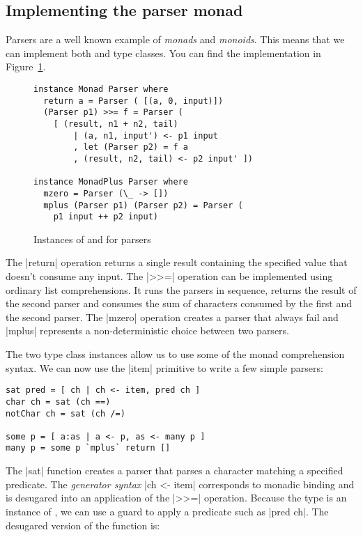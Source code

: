 \documentclass{tmr}
\begin{document}

\subsection{Implementing the parser monad}
Parsers are a well known example of \textit{monads} and \textit{monoids}. This means that we can 
implement both  and  type classes. You
can find the implementation in Figure~\ref{fig:monad-instance}.

\begin{figure}
\begin{verbatim}
instance Monad Parser where
  return a = Parser ( [(a, 0, input)])
  (Parser p1) >>= f = Parser (
    [ (result, n1 + n2, tail) 
        | (a, n1, input') <- p1 input
        , let (Parser p2) = f a
        , (result, n2, tail) <- p2 input' ])

instance MonadPlus Parser where 
  mzero = Parser (\_ -> [])
  mplus (Parser p1) (Parser p2) = Parser (
    p1 input ++ p2 input)
\end{verbatim}
\caption{Instances of  and  for parsers}
\label{fig:monad-instance}
\end{figure}

The |return| operation returns a single result containing the specified value that doesn't consume
any input. The |>>=| operation can be implemented using ordinary list comprehensions.
It runs the parsers in sequence, returns the result of the second parser and consumes the sum of 
characters consumed by the first and the second parser. The |mzero| operation creates a parser that 
always fail and |mplus| represents a non-deterministic
choice between two parsers. 

The two type class instances allow us to use some of the monad comprehension syntax. We can now 
use the |item| primitive to write a few simple parsers:

\begin{verbatim}
sat pred = [ ch | ch <- item, pred ch ]
char ch = sat (ch ==)
notChar ch = sat (ch /=)

some p = [ a:as | a <- p, as <- many p ]
many p = some p `mplus` return []
\end{verbatim}

The |sat| function creates a parser that parses a character matching a specified predicate. 
The \textit{generator syntax} |ch <- item| corresponds to monadic binding and is desugared 
into an application of the |>>=| operation. Because the  type is an instance
of , we can use a guard to apply a predicate such as |pred ch|. The 
desugared version of the function is:
\end{document}
